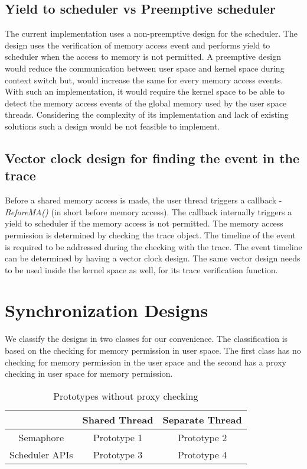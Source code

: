 \subsection{Yield to scheduler vs Preemptive scheduler}

The current implementation uses a non-preemptive design for the scheduler. 
The design uses the verification of memory access event and performs yield to scheduler when the access to memory is not permitted. 
A preemptive design would reduce the communication between user space and kernel space during context switch but, would increase the same for every memory access events. 
With such an implementation, it would require the kernel space to be able to detect the memory access events of the global memory used by the user space threads. 
Considering the complexity of its implementation and lack of existing solutions such a design would be not feasible to implement. 


\subsection{Vector clock design for finding the event in the trace}

Before a shared memory access is made, the user thread triggers a callback - \emph{BeforeMA()} (in short before memory access). 
The callback internally triggers a yield to scheduler if the memory access is not permitted. 
The memory access permission is determined by checking the trace object. 
The timeline of the event is required to be addressed during the checking with the trace. 
The event timeline can be determined by having a vector clock design. 
The same vector design needs to be used inside the kernel space as well, for its trace verification function.



\section{Synchronization Designs}

We classify the designs in two classes for our convenience. 
The classification is based on the checking for memory permission in user space. 
The first class has no checking for memory permission in the user space and the second has a proxy checking in user space for memory permission. 

\begin{table}[h]
\begin{center}
 \begin{tabular}{|c c c|} 
 \hline
 & Shared Thread & Separate Thread\\ %
 \hline
Semaphore & Prototype 1 & Prototype 2\\
Scheduler APIs & Prototype 3 & Prototype 4\\
\hline
\end{tabular}
\end{center}
\caption{Prototypes without proxy checking}
\label{protos_without_proxy}
\end{table}

